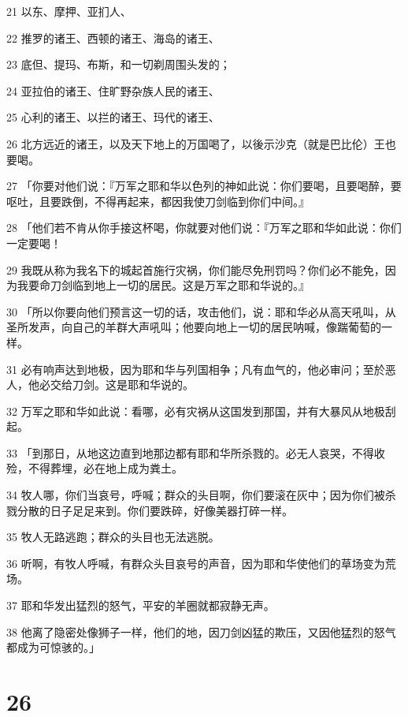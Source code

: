 \par 21 以东、摩押、亚扪人、
\par 22 推罗的诸王、西顿的诸王、海岛的诸王、
\par 23 底但、提玛、布斯，和一切剃周围头发的；
\par 24 亚拉伯的诸王、住旷野杂族人民的诸王、
\par 25 心利的诸王、以拦的诸王、玛代的诸王、
\par 26 北方远近的诸王，以及天下地上的万国喝了，以後示沙克（就是巴比伦）王也要喝。
\par 27 「你要对他们说：『万军之耶和华以色列的神如此说：你们要喝，且要喝醉，要呕吐，且要跌倒，不得再起来，都因我使刀剑临到你们中间。』
\par 28 「他们若不肯从你手接这杯喝，你就要对他们说：『万军之耶和华如此说：你们一定要喝！
\par 29 我既从称为我名下的城起首施行灾祸，你们能尽免刑罚吗？你们必不能免，因为我要命刀剑临到地上一切的居民。这是万军之耶和华说的。』
\par 30 「所以你要向他们预言这一切的话，攻击他们，说：耶和华必从高天吼叫，从圣所发声，向自己的羊群大声吼叫；他要向地上一切的居民呐喊，像踹葡萄的一样。
\par 31 必有响声达到地极，因为耶和华与列国相争；凡有血气的，他必审问；至於恶人，他必交给刀剑。这是耶和华说的。
\par 32 万军之耶和华如此说：看哪，必有灾祸从这国发到那国，并有大暴风从地极刮起。
\par 33 「到那日，从地这边直到地那边都有耶和华所杀戮的。必无人哀哭，不得收殓，不得葬埋，必在地上成为粪土。
\par 34 牧人哪，你们当哀号，呼喊；群众的头目啊，你们要滚在灰中；因为你们被杀戮分散的日子足足来到。你们要跌碎，好像美器打碎一样。
\par 35 牧人无路逃跑；群众的头目也无法逃脱。
\par 36 听啊，有牧人呼喊，有群众头目哀号的声音，因为耶和华使他们的草场变为荒场。
\par 37 耶和华发出猛烈的怒气，平安的羊圈就都寂静无声。
\par 38 他离了隐密处像狮子一样，他们的地，因刀剑凶猛的欺压，又因他猛烈的怒气都成为可惊骇的。」

\chapter{26}

